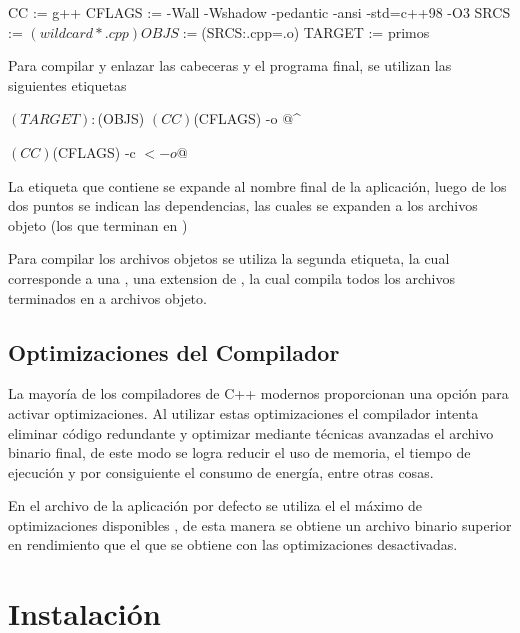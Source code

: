 \documentclass[12pt]{article}
\newenvironment{fullgrayverb}
{\verbbox}
{\endverbbox\par\colorbox{gray!25}{\parbox{\textwidth}{\theverbbox}}\par}
\begin{document}
\begin{fullgrayverb}[\mbox{}]
CC := g++
CFLAGS := -Wall -Wshadow -pedantic -ansi -std=c++98 -O3
SRCS := $(wildcard *.cpp)
OBJS := $(SRCS:.cpp=.o)
TARGET := primos
\end{fullgrayverb}

Para compilar y enlazar las cabeceras y el programa final, se utilizan las
siguientes etiquetas

\begin{fullgrayverb}[\mbox{}]
$(TARGET): $(OBJS)
    $(CC) $(CFLAGS) -o $@ $^

    $(CC) $(CFLAGS) -c $< -o $@
\end{fullgrayverb}

La etiqueta que contiene  se expande al nombre final de la
aplicación, luego de los dos puntos se indican las dependencias, las cuales se
expanden a los archivos objeto (los que terminan en )

Para compilar los archivos objetos se utiliza la segunda etiqueta, la cual
corresponde a una , una extension de , la cual
compila todos los archivos terminados en  a archivos objeto.

\subsection{Optimizaciones del Compilador}

La mayoría de los compiladores de C++ modernos proporcionan una opción para
activar optimizaciones. Al utilizar estas optimizaciones el compilador
intenta eliminar código redundante y optimizar mediante técnicas avanzadas el
archivo binario final, de este modo se logra reducir el uso de memoria, el
tiempo de ejecución y por consiguiente el consumo de energía, entre otras cosas.

En el archivo  de la aplicación por defecto se utiliza el el
máximo de optimizaciones disponibles , de esta manera se obtiene un
archivo binario superior en rendimiento que el que se obtiene con las
optimizaciones desactivadas.


\section{Instalación}
\end{document}
